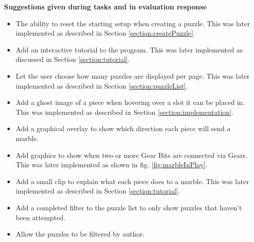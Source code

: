 \documentclass{l4proj}
\begin{document}
\textbf{Suggestions given during tasks and in evaluation response}
\label{suggestions}
\begin{itemize}
    \item The ability to reset the starting setup when creating a puzzle. This was later implemented as described in Section \ref{section:createPuzzle}.
    \item Add an interactive tutorial to the program. This was later implemented as discussed in Section \ref{section:tutorial}.
    \item Let the user choose how many puzzles are displayed per page. This was later implemented as described in Section \ref{section:puzzleList}.
    \item Add a ghost image of a piece when hovering over a slot it can be placed in. This was implemented as described in Section \ref{section:implementation}.
    \item Add a graphical overlay to show which direction each piece will send a marble.
    \item Add graphics to show when two or more Gear Bits are connected via Gears. This was later implemented as shown in fig. \ref{fig:marbleInPlay}.
    \item Add a small clip to explain what each piece does to a marble. This was later implemented as described in Section \ref{section:tutorial}.
    \item Add a completed filter to the puzzle list to only show puzzles that haven't been attempted.
    \item Allow the puzzles to be filtered by author.
\end{itemize}
\end{document}
